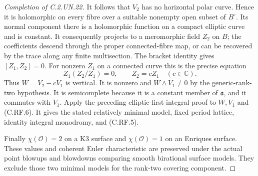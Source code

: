 \begin{proof}[Completion of C.2.UN.22]
It follows that $V_2$ has no horizontal polar curve.
Hence it is holomorphic on every fibre over a suitable
nonempty open subset of $B^\circ$. Its normal component
there is a holomorphic function on a compact elliptic
curve and is constant. It consequently projects to a
meromorphic field $Z_2$ on $B$; the coefficients descend
through the proper connected-fibre map, or can be
recovered by the trace along any finite multisection.
The bracket identity gives $[Z_1,Z_2]=0$. For nonzero
$Z_1$ on a connected curve this is the precise equation
\[
              Z_1(Z_2/Z_1)=0,
              \qquad Z_2=cZ_1\quad(c\in\mathbb C).
                                                               \tag{C.RF.8}
\]
Thus $W=V_2-cV_1$ is vertical. It is nonzero and
$W\wedge V_1\ne0$ by the generic-rank-two hypothesis.
It is semicomplete because it is a constant member of
$\mathfrak a$, and it commutes with $V_1$. Apply the
preceding elliptic-first-integral proof to $W,V_1$
and (C.RF.6). It gives the stated relatively minimal
model, fixed period lattice, identity integral monodromy,
and (C.RF.5).

Finally $\chi(\mathcal O)=2$ on a K3 surface and
$\chi(\mathcal O)=1$ on an Enriques surface. These
values and coherent Euler characteristic are preserved
under the actual point blowups and blowdowns comparing
smooth birational surface models. They exclude those
two minimal models for the rank-two covering component.
\end{proof}
